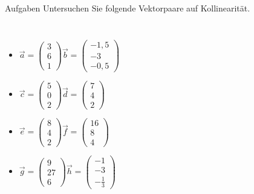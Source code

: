 \documentclass[11pt, aspectratio=169]{beamer}
\begin{document}
	\begin{frame}{Aufgaben}
		Untersuchen Sie folgende Vektorpaare auf Kollinearität.
		\begin{columns}
			\begin{itemize}
				\item $\vec{a} = \left( \begin{array}{c} 3 \\ 6 \\ 1 \end{array} \right) \vec{b} = \left( \begin{array}{c} -1,5 \\ -3 \\ -0,5 \end{array} \right)$
				\color{green}
				\uncover<2->\checkmark
				\color{black}
				\item $\vec{c} = \left( \begin{array}{c} 5 \\ 0 \\ 2 \end{array} \right) \vec{d} = \left( \begin{array}{c} 7 \\ 4 \\ 2 \end{array} \right)$
				\item $\vec{e} = \left( \begin{array}{c} 8 \\ 4 \\ 2 \end{array} \right) \vec{f} = \left( \begin{array}{c} 16 \\ 8 \\ 4 \end{array} \right)$
				\color{green}
				\uncover<2->\checkmark
				\color{black}
				\item $\vec{g} = \left( \begin{array}{c} 9 \\ 27 \\ 6 \end{array} \right) \vec{h} = \left( \begin{array}{c} -1 \\ -3 \\ -\frac{1}{3} \end{array} \right)$
				\color{green}
				\uncover<2->\checkmark
				\color{black}
			\end{itemize}
			\begin{itemize}

\end{itemize}
\end{columns}
\end{frame}
\end{document}
